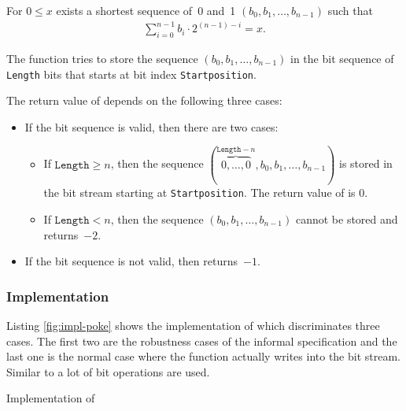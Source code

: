 For $0 \leq x$ exists a shortest sequence of~0 and~1
$(b_0, b_1,\ldots,b_{n - 1})$
such that
\begin{align}
    \sum_{i=0}^{n-1} b_i \cdot 2^{(n - 1) - i} = x.
\end{align}

The function \poke tries to store the sequence $(b_0, b_1,\ldots,b_{n - 1})$
in the bit sequence of \texttt{Length} bits that starts
at bit index \texttt{Startposition}.

The return value of \poke depends on the following three cases:

\begin{itemize}
\item 
If the bit sequence is valid, then there are two cases:

\begin{itemize}
\item
If $\texttt{Length} \geq n$, then  the sequence
$(\overbrace{0,\ldots,0}^{\texttt{Length}-n},b_0, b_1,\ldots,b_{n - 1})$
is stored in the bit stream starting at \texttt{Startposition}.
The return value of \poke is 0.

\item
If $\texttt{Length} < n$, then the
sequence $(b_0, b_1,\ldots,b_{n - 1})$ cannot be stored and\\
\poke returns~$-2$.
\end{itemize}

\item 
If the bit sequence is not valid, then \poke returns~$-1$.
\end{itemize}

\subsubsection{Implementation}
\label{impl-poke}
Listing \ref{fig:impl-poke} shows the implementation of \poke
which discriminates three cases. The first two are the robustness cases
of the informal specification and the last one is
the normal case where the function actually writes into the bit stream.
Similar to \peek a lot of bit operations are used. 

\begin{listing}[hbt]
\begin{minipage}{\textwidth}

\end{minipage}
\caption{\label{fig:impl-poke} Implementation of \poke}
\end{listing}



